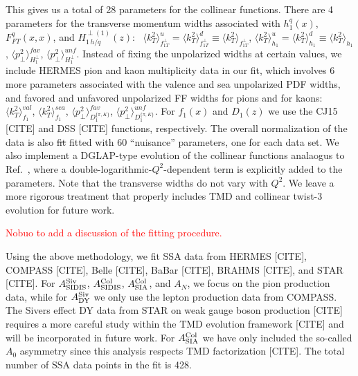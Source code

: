 \documentclass[twocolumn,prl,aps,superscriptaddress
               ,footinbib,amsfonts,amsmath,amssymb,showpacs]{revtex4-1}
\def\kT{k_T}
\def\pperp{p_\perp}
\def\avkT{\la \kT^2 \ra}
\def\avpperp{\la \pperp^2 \ra}
\newcommand{\la}{\langle}
\newcommand{\ra}{\rangle}
\newcommand{\rep}[2]{{\color{blue} \st{#1}} {\color{red} #2}}
\begin{document}
%
This gives us a total of 28 parameters for the collinear functions.  
There are 4 parameters for the transverse momentum widths associated with
$h_1^q(x)$, $F_{FT}^q(x,x)$, and  $H_{1 \,h/q}^{\perp (1)}(z)$:~
    $\avkT^{u}_{f_{1T}^\perp}=\avkT^{d}_{f_{1T}^\perp}
                              \equiv\avkT_{f_{1T}^\perp}$, 
    $\avkT_{h_1}^u=\avkT_{h_1}^d\equiv \avkT_{h_1}$, 
    $\avpperp^{fav}_{H_1^\perp}$,
    $\avpperp^{unf}_{H_1^\perp}$.  
%
Instead of fixing the unpolarized widths at certain values, we include
HERMES pion and kaon multiplicity data in our fit, which involves 6
more parameters associated with the valence and sea unpolarized PDF
widths, and favored and unfavored unpolarized FF widths for pions and
for kaons:
  ~ $\avkT^{val}_{f_1}$,
    $\avkT^{sea}_{f_1}$, 
    $\avpperp^{fav}_{D_1^{\{\pi,K\}}}$,
    $\avpperp^{unf}_{D_1^{\{\pi,K\}}}$.  
For $f_1(x)$ and $D_1(z)$ we use the CJ15 [CITE] and DSS [CITE]
functions, respectively.  
%
The overall normalization of the data is also \rep{fit}{fitted} with
60 ``nuisance'' parameters, one for each data set.  
%
We also implement a DGLAP-type evolution of the collinear functions
analaogus to Ref.~\cite{Duke:1983gd}, where a
double-logarithmic-$Q^2$-dependent term is explicitly added to the
parameters.  
%
Note that the transverse widths do not vary with $Q^2$.
We leave a more rigorous treatment that properly includes TMD and
collinear twist-3 evolution for future work.

\textcolor{red}{Nobuo to add a discussion of the fitting procedure.}

\vspace{0.1cm}
%
Using the above methodology, we fit SSA data from HERMES [CITE],
COMPASS [CITE], Belle [CITE], BaBar [CITE], BRAHMS [CITE], and STAR
[CITE].  
%
For $A_{\rm SIDIS}^{\rm Siv}$, 
    $A_{\rm SIDIS}^{\rm Col}$,
    $A_{\rm SIA}^{\rm Col}$, and $A_N$, 
we focus on the pion production data, while for $A_{\rm DY}^{\rm Siv}$
we only use the lepton production data from COMPASS.  
%
The Sivers effect DY data from STAR on weak gauge boson production
[CITE] requires a more careful study within the TMD evolution
framework [CITE] and will be incorporated in future work.  
%
For $A_{\rm SIA}^{\rm Col}$ we have only included the so-called $A_0$
asymmetry since this analysis respects TMD factorization [CITE].  
%
The total number of SSA data points in the fit is 428.
\end{document}

